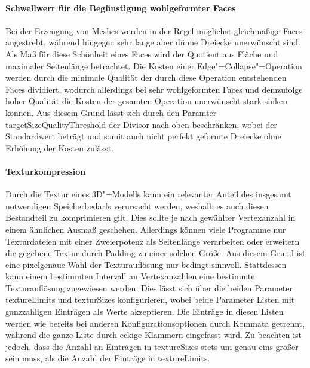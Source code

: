 \paragraph{Schwellwert für die Begünstigung wohlgeformter Faces} Bei der Erzeugung von Meshes werden in der Regel möglichst gleichmäßige Faces angestrebt, während hingegen sehr lange aber dünne Dreiecke unerwünscht sind. Als Maß für diese \glqq{}Schönheit\grqq{} eines Faces wird der Quotient aus Fläche und maximaler Seitenlänge betrachtet. Die Kosten einer Edge"=Collapse"=Operation werden durch die minimale Qualität der durch diese Operation entstehenden Faces dividiert, wodurch allerdings bei sehr wohlgeformten Faces und demzufolge hoher Qualität die Kosten der gesamten Operation unerwünscht stark sinken können. Aus diesem Grund lässt sich durch den Paramter {\ttfamily target\-Size\-Quality\-Threshold} der Divisor nach oben beschränken, wobei der Standardwert {} beträgt und somit auch nicht perfekt geformte Dreiecke ohne Erhöhung der Kosten zulässt.

\paragraph{Texturkompression} Durch die Textur eines 3D"=Modells kann ein relevanter Anteil des insgesamt notwendigen Speicherbedarfs verursacht werden, weshalb es auch diesen Bestandteil zu komprimieren gilt. Dies sollte je nach gewählter Vertexanzahl in einem ähnlichen Ausmaß geschehen. Allerdings können viele Programme nur Texturdateien mit einer Zweierpotenz als Seitenlänge verarbeiten oder erweitern die gegebene Textur durch Padding zu einer solchen Größe. Aus diesem Grund ist eine pixelgenaue Wahl der Texturauflösung nur bedingt sinnvoll. Stattdessen kann einem bestimmten Intervall an Vertexanzahlen eine bestimmte Texturauflösung zugewiesen werden. Dies lässt sich über die beiden Parameter {\ttfamily texture\-Limits} und {\ttfamily textur\-Sizes} konfigurieren, wobei beide Parameter Listen mit ganzzahligen Einträgen als Werte akzeptieren. Die Einträge in diesen Listen werden wie bereits bei anderen Konfigurationsoptionen durch Kommata getrennt, während die ganze Liste durch eckige Klammern eingefasst wird. Zu beachten ist jedoch, dass die Anzahl an Einträgen in {\ttfamily texture\-Sizes} stets um genau eins größer sein muss, als die Anzahl der Einträge in {\ttfamily texture\-Limits}. 

